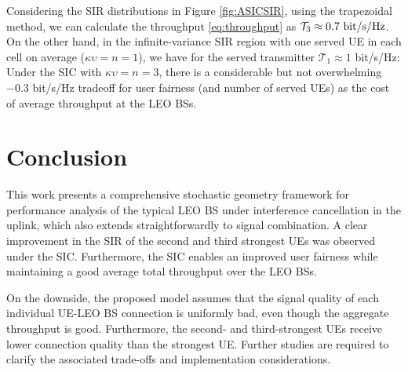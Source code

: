 \documentclass[lettersize,journal]{IEEEtran}
\begin{document}
Considering the SIR distributions in Figure \ref{fig:ASICSIR}, using the trapezoidal method, we can calculate the throughput \eqref{eq:throughput} as $\mathcal{T}_{3}\approx 0.7 \textup{ bit/s/Hz}$. On the other hand, in the infinite-variance SIR region with one served UE in each cell on average ($\kappa \upsilon =n=1$), we have for the served transmitter $\mathcal{T}_1 \approx 1$ bit/s/Hz: Under the SIC with $\kappa \upsilon=n=3$, there is a considerable but not overwhelming $-0.3$ bit/s/Hz tradeoff for user fairness (and number of served UEs) as the cost of average throughput at the LEO BSs. %

\section{Conclusion}
This work presents a comprehensive stochastic geometry framework for performance analysis of the typical LEO BS under interference cancellation in the uplink, which also extends straightforwardly to signal combination. %
 A clear improvement in the SIR of the second and third strongest UEs was observed under the SIC. Furthermore, the SIC enables an improved user fairness while maintaining a good average total throughput over the LEO BSs.


 On the downside, the proposed model assumes that the signal quality of each individual UE-LEO BS connection is uniformly bad, even though the aggregate throughput is good. Furthermore, the second- and third-strongest UEs receive lower connection quality than the strongest UE. Further studies are required to clarify the associated trade-offs and implementation considerations. 
\end{document}

